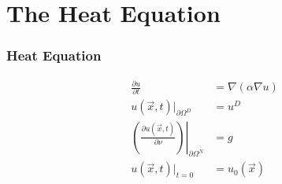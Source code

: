 \section{The Heat Equation}
\begin{frame}
	\frametitle{Heat Equation}
	\begin{align*}
		\frac{\partial u}{\partial t} &= \nabla(\alpha\nabla u)\\
		u(\vec{x},t)|_{\partial\Omega^D} &= u^D\\
		\left.\left( \frac{\partial u(\vec{x},t)}{\partial \nu}\right)\right|_{\partial\Omega^N} &= g\\
		u(\vec{x},t)|_{t=0} &=u_0(\vec{x}) \label{eqn::u_0}
	\end{align*}
\end{frame}